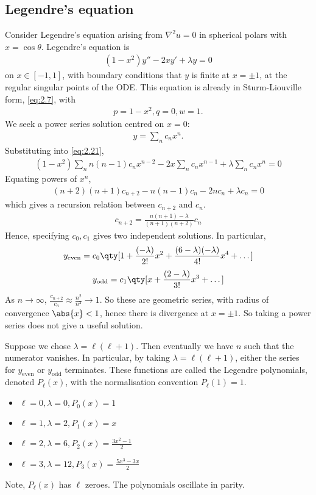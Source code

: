 \subsection{Legendre's equation}
Consider Legendre's equation arising from $\nabla^2 u = 0$ in spherical polars with $x = \cos\theta$.
Legendre's equation is
\begin{align}
    (1-x^2)y'' - 2xy' + \lambda y = 0 \label{eq:2.21}
\end{align}
on $x \in [-1,1]$, with boundary conditions that $y$ is finite at $x = \pm 1$, at the regular singular points of the ODE.
This equation is already in Sturm-Liouville form, \cref{eq:2.7}, with
\begin{align*}
    p=1-x^2, q=0, w=1.
\end{align*}
We seek a power series solution centred on $x = 0$:
\begin{align*}
    y = \sum_n c_n x^n.
\end{align*}
Substituting into \cref{eq:2.21},
\begin{align*}
    (1-x^2) \sum_n n(n-1) c_n x^{n-2} - 2x \sum_n c_n x^{n-1} + \lambda \sum_n c_n x^n = 0
\end{align*}
Equating powers of $x^n$,
\begin{align*}
    (n+2)(n+1)c_{n+2} - n(n-1)c_n - 2n c_n + \lambda c_n = 0
\end{align*}
which gives a recursion relation between $c_{n+2}$ and $c_n$.
\begin{align} \label{eq:2.22}
    c_{n+2} = \frac{n(n+1) - \lambda}{(n+1)(n+2)} c_n
\end{align}
Hence, specifying $c_0, c_1$ gives two independent solutions.
In particular,
\begin{align*}
    y_{\text{even}} = c_0 \qty[1 + \frac{(-\lambda)}{2!}x^2 + \frac{(6-\lambda)(-\lambda)}{4!} x^4 + \dots]
\end{align*}
\begin{align*}
    y_{\text{odd}} = c_1 \qty[x + \frac{(2-\lambda)}{3!}x^3 + \dots]
\end{align*}
As $n \to \infty$, $\frac{c_{n+2}}{c_n} \approx \frac{n^2}{n^2} \to 1$.
So these are geometric series, with radius of convergence $\abs{x} < 1$, hence there is divergence at $x = \pm 1$.
So taking a power series does not give a useful solution.

Suppose we chose $\lambda = \ell (\ell + 1)$.
Then eventually we have $n$ such that the numerator vanishes.
In particular, by taking $\lambda = \ell (\ell + 1)$, either the series for $y_{\text{even}}$ or $y_{\text{odd}}$ terminates.
These functions are called the Legendre polynomials, denoted $P_\ell(x)$, with the normalisation convention $P_\ell(1) = 1$.
\begin{itemize}
    \item $\ell = 0, \lambda = 0, P_0(x) = 1$
    \item $\ell = 1, \lambda = 2, P_1(x) = x$
    \item $\ell = 2, \lambda = 6, P_2(x) = \frac{3x^2 - 1}{2}$
    \item $\ell = 3, \lambda = 12, P_3(x) = \frac{5x^3 - 3x}{2}$
\end{itemize}
Note, $P_\ell(x)$ has $\ell$ zeroes.
The polynomials oscillate in parity.

